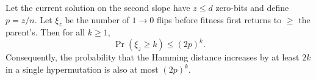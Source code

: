 
\begin{lemma}
	Let the current solution on the second slope have $z\le d$ zero-bits and 
	define $p=z/n$.  
	Let $\xi_z$ be the number of $1\to0$ flips before fitness first returns to 
	$\ge$ the parent's.  
	Then for all $k\ge1$,
	\[
	\Pr(\xi_z\ge k)\le (2p)^k.
	\]
	Consequently, the probability that the Hamming distance increases by at least 
	$2k$ in a single hypermutation is also at most $(2p)^k$.
\end{lemma}

%	
%	
%	
%	
%	
%

